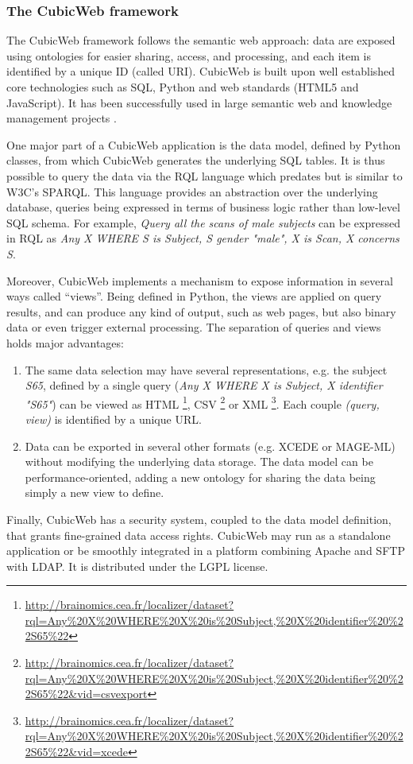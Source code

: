 \documentclass[review]{elsarticle}
\begin{document}
\subsubsection{The CubicWeb framework}
\label{sec:cubicweb}

The CubicWeb framework \cite{CubicWeb} follows the semantic web approach: data are exposed using ontologies for easier sharing, access, and processing, and each item is identified by a unique ID (called URI). CubicWeb is built upon well established core technologies such as SQL, Python and web standards (HTML5 and JavaScript). It has been successfully used in large semantic web and knowledge management projects \cite{Simon2013}.

One major part of a CubicWeb application is the data model, defined by Python classes, from which CubicWeb generates the underlying SQL tables. It is thus possible to query the data via the RQL language which predates but is similar to W3C's SPARQL. This language provides an abstraction over the underlying database, queries being expressed in terms of business logic rather than low-level SQL schema. For example, \emph{Query all the scans of male subjects} can be expressed in RQL as \emph{Any X WHERE S is Subject, S gender "male", X is Scan, X concerns S}.

Moreover, CubicWeb implements a mechanism to expose information in several ways called ``views''. Being defined in Python, the views are applied on query results, and can produce any kind of output, such as web pages, but also binary data or even trigger external processing. The separation of queries and views holds major advantages:
\begin{enumerate}[label=\roman*)]
\item The same data selection may have several representations, e.g. the subject \emph{S65}, defined by a single query (\emph{Any X WHERE X is Subject, X identifier "S65"}) can be viewed as HTML \footnote{\url{http://brainomics.cea.fr/localizer/dataset?rql=Any\%20X\%20WHERE\%20X\%20is\%20Subject,\%20X\%20identifier\%20\%22S65\%22}}, CSV \footnote{\url{http://brainomics.cea.fr/localizer/dataset?rql=Any\%20X\%20WHERE\%20X\%20is\%20Subject,\%20X\%20identifier\%20\%22S65\%22&vid=csvexport}} or XML \footnote{\url{http://brainomics.cea.fr/localizer/dataset?rql=Any\%20X\%20WHERE\%20X\%20is\%20Subject,\%20X\%20identifier\%20\%22S65\%22&vid=xcede}}. Each couple \emph{(query, view)} is identified by a unique URL.
\item Data can be exported in several other formats (e.g. XCEDE or MAGE-ML) without modifying the underlying data storage. The data model can be performance-oriented, adding a new ontology for sharing the data being simply a new view to define.
\end{enumerate}
Finally, CubicWeb has a security system, coupled to the data model definition, that grants fine-grained data access rights. CubicWeb may run as a standalone application or be smoothly integrated in a platform combining Apache and SFTP with LDAP. It is distributed under the LGPL license.
\end{document}
